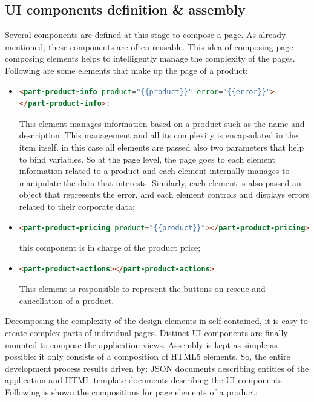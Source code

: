 \subsection{UI components definition \& assembly}
Several components are defined at this stage to compose a page. As already mentioned, these components are often reusable.
\newline
This idea of composing page composing elements helps to intelligently manage the complexity of the pages. Following are some elements that make up the page of a product:
\begin{itemize}
\item
\begin{lstlisting}[language=html]
<part-product-info product="{{product}}" error="{{error}}">
</part-product-info>:
\end{lstlisting}
This element manages information based on a product such as the name and description. This management and all its complexity is encapsulated in the item itself. in this case all elements are passed also two parameters that help to bind variables. So at the page level, the page goes to each element information related to a product and each element internally manages to manipulate the data that interests. Similarly, each element is also passed an object that represents the error, and each element controls and displays errors related to their corporate data;
\item
\begin{lstlisting}[language=html]
<part-product-pricing product="{{product}}"></part-product-pricing>
\end{lstlisting}
this component is in charge of the product price;
\item
\begin{lstlisting}[language=html]
<part-product-actions></part-product-actions>
\end{lstlisting}
This element is responsible to represent the buttons on rescue and cancellation of a product.
\end{itemize}
Decomposing the complexity of the design elements in self-contained, it is easy to create complex parts of individual pages.
\newline
Distinct UI components are finally mounted to compose the application views. Assembly is kept as simple as possible: it only consists of a composition of HTML5 elements. So, the entire development process results driven by: JSON documents describing entities of the application and HTML template documents describing the UI components. Following is shown the compositions for page elements of a product:
